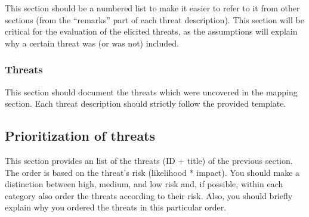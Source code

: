 \documentclass[a4paper]{article}
\begin{document}
This section should be a numbered list to make it easier to refer to it from other sections (from the ``remarks'' part of each threat description).
This section will be critical for the evaluation of the elicited threats, as the assumptions will explain why a certain threat was (or was not) included.



\subsubsection{Threats}
This section should document the threats which were uncovered in the mapping section.
Each threat description should strictly follow the provided template.



\subsection{Prioritization of threats}
This section provides an list of the threats (ID + title) of the previous section. The order is based on the threat's risk (likelihood * impact). You should make a distinction between high, medium, and low risk and, if possible, within each category also order the threats according to their risk.
Also, you should briefly explain why you ordered the threats in this particular order.
\end{document}
